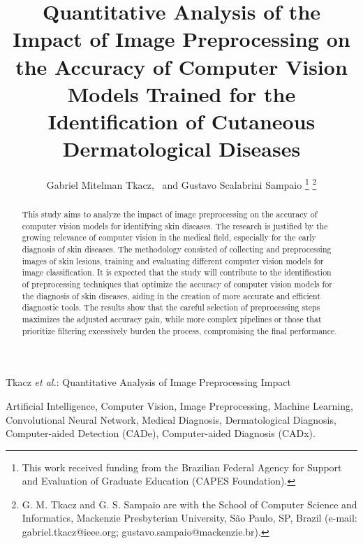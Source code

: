 \documentclass[journal]{IEEEtran}
\begin{document}
\title{Quantitative Analysis of the Impact of Image Preprocessing on the Accuracy of Computer Vision Models Trained for the Identification of Cutaneous Dermatological Diseases}

\author{Gabriel Mitelman Tkacz,~
        and Gustavo Scalabrini Sampaio%
\thanks{This work received funding from the Brazilian Federal Agency for Support and Evaluation of Graduate Education (CAPES Foundation).}%
\thanks{G. M. Tkacz and G. S. Sampaio are with the School of Computer Science and Informatics, Mackenzie Presbyterian University, São Paulo, SP, Brazil (e-mail: gabriel.tkacz@ieee.org; gustavo.sampaio@mackenzie.br).}}

%
{Tkacz \MakeLowercase{\textit{et al.}}: Quantitative Analysis of Image Preprocessing Impact}

\maketitle

\begin{abstract}
This study aims to analyze the impact of image preprocessing on the accuracy of computer vision models for identifying skin diseases. The research is justified by the growing relevance of computer vision in the medical field, especially for the early diagnosis of skin diseases. The methodology consisted of collecting and preprocessing images of skin lesions, training and evaluating different computer vision models for image classification. It is expected that the study will contribute to the identification of preprocessing techniques that optimize the accuracy of computer vision models for the diagnosis of skin diseases, aiding in the creation of more accurate and efficient diagnostic tools. The results show that the careful selection of preprocessing steps maximizes the adjusted accuracy gain, while more complex pipelines or those that prioritize filtering excessively burden the process, compromising the final performance.
\end{abstract}

\begin{IEEEkeywords}
Artificial Intelligence, Computer Vision, Image Preprocessing, Machine Learning, Convolutional Neural Network, Medical Diagnosis, Dermatological Diagnosis, Computer-aided Detection (CADe), Computer-aided Diagnosis (CADx).
\end{IEEEkeywords}
\end{document}
